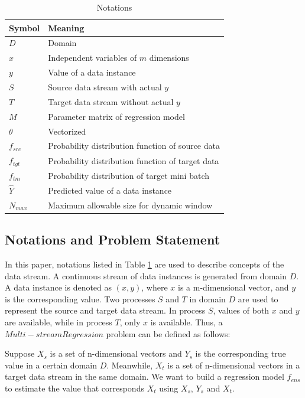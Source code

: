 \documentclass[conference,compsoc]{IEEEtran}
\begin{document}
\begin{table}[H]
\centering
\caption{Notations}
\label{tab1}
\begin{tabular}{|l|l|}
\hline
 Symbol & Meaning \\ \hline
 $D$ & Domain \\ \hline
 $x$ & Independent variables of $m$ dimensions \\ \hline
 $y$ & Value of a data instance \\ \hline
 $S$ & Source data stream with actual $y$ \\ \hline
 $T$ & Target data stream without actual $y$  \\ \hline
 $M$ & Parameter matrix of regression model  \\ \hline
 $\theta$ & Vectorized \\ \hline
 $f_{src}$ & Probability distribution function of source data \\ \hline 
 $f_{tgt}$ & Probability distribution function of target data \\ \hline
 $f_{tm}$ & Probability distribution of target mini batch \\ \hline
 $\hat{Y}$ & Predicted value of a data instance \\ \hline
 $N_{max}$ & Maximum allowable size for dynamic window \\ \hline
\end{tabular}
\end{table}

\subsection{Notations and Problem Statement }
\label{notations}
In this paper, notations listed in Table \ref{tab1} are used to describe concepts of the data stream. 
A continuous stream of 
data instances is generated from domain $D$. A data instance is
denoted as $(x, y)$, where $x$ is a m-dimensional vector, and $y$ is the corresponding value. Two processes $S$ and $T$ in
domain $D$ are used to represent the source and target data stream.
In process $S$, values of both $x$ and $y$ are available, while
in process $T$, only $x$ is available. Thus, a 
$Multi-stream Regression$ problem can be defined as follows:

Suppose $X_{s}$ is a set of n-dimensional vectors and $Y_{s}$ is the corresponding true value  in a certain domain $D$. Meanwhile, $X_{t}$ is a set of 
n-dimensional vectors in a target data stream in the
same domain. We want to build a regression model $f_{ens}$ to
estimate the value that corresponds $X_{t}$ using $X_{s}$,
$Y_{s}$ and $X_{t}$.
\end{document}
